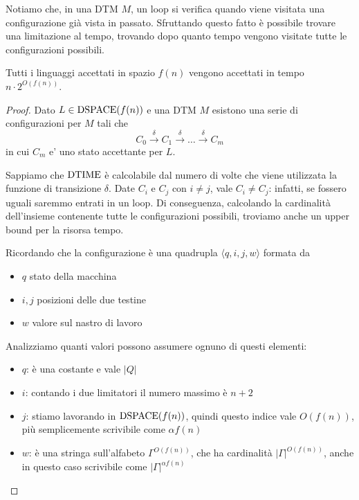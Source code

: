 Notiamo che, in una DTM $M$, un loop si verifica quando viene visitata una configurazione già vista in passato. Sfruttando questo fatto è possibile trovare una limitazione al tempo, trovando dopo quanto tempo vengono visitate tutte le configurazioni possibili.\\

\begin{theor}
	Tutti i linguaggi accettati in spazio $f(n)$ vengono accettati in tempo $n \cdot 2^{O(f(n))}$. 
\end{theor}
\begin{proof}
	Dato $L \in \text{DSPACE} (f(n))$ e una DTM $M$ esistono una serie di configurazioni per $M$ tali che
	$$ C_0 \xrightarrow{\delta} C_1 \xrightarrow{\delta} \dots \xrightarrow{\delta} C_m $$
	in cui $C_m$ e' uno stato accettante per $L$.
	
	Sappiamo che $\text{DTIME}$ è calcolabile dal numero di volte che viene utilizzata la funzione di transizione $\delta$. Date $C_i$ e $C_j$ con $i \neq j$, vale $C_i \neq C_j$: infatti, se fossero uguali saremmo entrati in un loop. Di conseguenza, calcolando la cardinalità dell'insieme contenente tutte le configurazioni possibili, troviamo anche un upper bound per la risorsa tempo.
	
	Ricordando che la configurazione è una quadrupla $\langle q, i, j, w \rangle$ formata da
	\begin{itemize}
		\item $q$ stato della macchina
		\item $i,j$ posizioni delle due testine
		\item $w$ valore sul nastro di lavoro
	\end{itemize}
	
	Analizziamo quanti valori possono assumere ognuno di questi elementi:
	\begin{itemize}
		\item $q$: è una costante e vale $|Q|$
		\item $i$: contando i due limitatori il numero massimo è $n+2$ 
		\item $j$: stiamo lavorando in $\text{DSPACE} (f(n))$, quindi questo indice vale $O(f(n))$, più semplicemente scrivibile come $\alpha f(n)$
		\item $w$: è una stringa sull'alfabeto $\Gamma^{O(f(n))}$, che ha cardinalità $|\Gamma|^{O(f(n))}$, anche in questo caso scrivibile come $|\Gamma|^{\alpha f(n)}$
	\end{itemize}
	

\end{proof}
